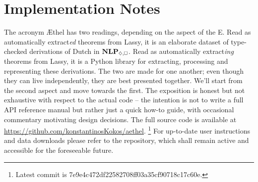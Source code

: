 
\section{Implementation Notes}
\label{appendix:implementation_notes}
The acronym \AE thel has two readings, depending on the aspect of the E.
Read as automatically extract\textit{ed} theorems from Lassy, it is an elaborate dataset of type-checked derivations of Dutch in $\NLPplus{}$.
Read as automatically extract\textit{ing} theorems from Lassy, it is a Python library for extracting, processing and representing these derivations.
The two are made for one another; even though they can live independently, they are best presented together.
We'll start from the second aspect and move towards the first.
The exposition is honest but not exhaustive with respect to the actual code -- the intention is not to write a full API reference manual but rather just a quick how-to guide, with occasional commentary motivating design decisions.
The full source code is available at \url{https://github.com/konstantinosKokos/aethel}.%
	\footnote{Latest commit is 7e9e4c472df22582708ff03a35cf90718c17c60e.}
For up-to-date user instructions and data downloads please refer to the repository, which shall remain active and accessible for the foreseeable future.


